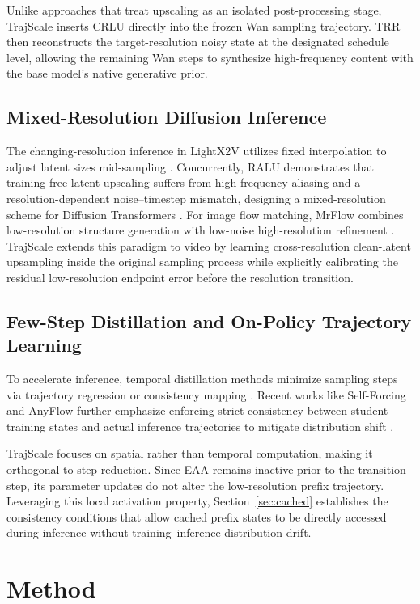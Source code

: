 Unlike approaches that treat upscaling as an isolated post-processing stage,
TrajScale inserts CRLU directly into the frozen Wan sampling trajectory. TRR
then reconstructs the target-resolution noisy state at the designated schedule
level, allowing the remaining Wan steps to synthesize high-frequency content
with the base model's native generative prior.

\subsection{Mixed-Resolution Diffusion Inference}
The changing-resolution inference in LightX2V utilizes fixed interpolation to adjust latent sizes mid-sampling \citep{lightx2v2026}. Concurrently, RALU demonstrates that training-free latent upscaling suffers from high-frequency aliasing and a resolution-dependent noise--timestep mismatch, designing a mixed-resolution scheme for Diffusion Transformers \citep{jeong2025ralu}. For image flow matching, MrFlow combines low-resolution structure generation with low-noise high-resolution refinement \citep{zheng2026mrflow}. TrajScale extends this paradigm to video by learning cross-resolution
clean-latent upsampling inside the original sampling process while explicitly
calibrating the residual low-resolution endpoint error before the resolution
transition.

\subsection{Few-Step Distillation and On-Policy Trajectory Learning}
To accelerate inference, temporal distillation methods minimize sampling steps via trajectory regression or consistency mapping \citep{luo2023lcm, yin2024dmd2, zhai2024mcm}. Recent works like Self-Forcing and AnyFlow further emphasize enforcing strict consistency between student training states and actual inference trajectories to mitigate distribution shift \citep{huang2025selfforcing, gu2026anyflow}.

TrajScale focuses on spatial rather than temporal computation, making it orthogonal to step reduction. Since EAA remains inactive prior to the transition step, its parameter updates do not alter the low-resolution prefix trajectory. Leveraging this local activation property, Section~\ref{sec:cached} establishes the consistency conditions that allow cached prefix states to be directly accessed during inference without training--inference distribution drift.

\section{Method}
\label{sec:method}

